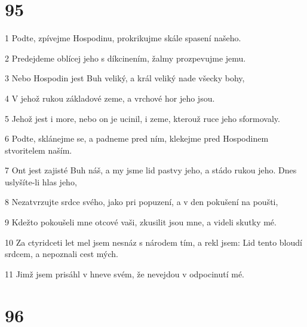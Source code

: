 \chapter{95}

\par 1 Podte, zpívejme Hospodinu, prokrikujme skále spasení našeho.
\par 2 Predejdeme oblícej jeho s díkcinením, žalmy prozpevujme jemu.
\par 3 Nebo Hospodin jest Buh veliký, a král veliký nade všecky bohy,
\par 4 V jehož rukou základové zeme, a vrchové hor jeho jsou.
\par 5 Jehož jest i more, nebo on je ucinil, i zeme, kterouž ruce jeho sformovaly.
\par 6 Podte, sklánejme se, a padneme pred ním, klekejme pred Hospodinem stvoritelem naším.
\par 7 Ont jest zajisté Buh náš, a my jsme lid pastvy jeho, a stádo rukou jeho. Dnes uslyšíte-li hlas jeho,
\par 8 Nezatvrzujte srdce svého, jako pri popuzení, a v den pokušení na poušti,
\par 9 Kdežto pokoušeli mne otcové vaši, zkusilit jsou mne, a videli skutky mé.
\par 10 Za ctyridceti let mel jsem nesnáz s národem tím, a rekl jsem: Lid tento bloudí srdcem, a nepoznali cest mých.
\par 11 Jimž jsem prisáhl v hneve svém, že nevejdou v odpocinutí mé.

\chapter{96}

